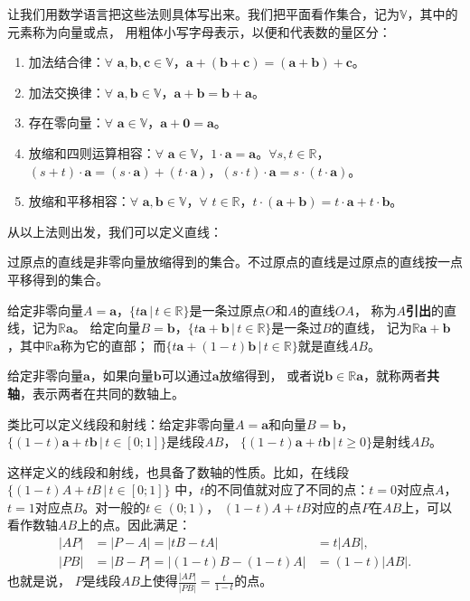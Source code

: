 \documentclass[12pt,UTF8,fontset=none]{ctexbook}
\begin{document}
让我们用数学语言把这些法则具体写出来。我们把平面看作集合，记为$\mathbb{V}$，其中的元素称为向量或点，
用粗体小写字母表示，以便和代表数的量区分：
\begin{enumerate}
    \item 加法结合律：$\forall \,\, \mathbf{a}, \mathbf{b}, \mathbf{c} \in \mathbb{V}$，$\mathbf{a}+ (\mathbf{b} + \mathbf{c}) = (\mathbf{a} + \mathbf{b}) + \mathbf{c}$。
    \item 加法交换律：$\forall \,\, \mathbf{a}, \mathbf{b} \in \mathbb{V}$，$\mathbf{a} + \mathbf{b} = \mathbf{b} + \mathbf{a}$。
    \item 存在零向量：$\forall \,\, \mathbf{a} \in \mathbb{V}$，$\mathbf{a} + \mathbf{0} = \mathbf{a}$。
    \item 放缩和四则运算相容：$\forall \,\, \mathbf{a} \in \mathbb{V}$，$1\cdot \mathbf{a} = \mathbf{a}$。$\forall s, t \in \mathbb{R}$，$(s + t)\cdot\mathbf{a} = (s\cdot\mathbf{a}) + (t\cdot\mathbf{a})$，$(s \cdot t)\cdot \mathbf{a} = s \cdot (t\cdot \mathbf{a})$。
    \item 放缩和平移相容：$\forall \,\, \mathbf{a}, \mathbf{b} \in \mathbb{V}$，$\forall \,\, t \in \mathbb{R}$，$t\cdot(\mathbf{a} + \mathbf{b}) = t\cdot\mathbf{a} + t\cdot\mathbf{b}$。
\end{enumerate}

从以上法则出发，我们可以定义直线：
\begin{df}
    过原点的直线是非零向量放缩得到的集合。不过原点的直线是过原点的直线按一点平移得到的集合。
\end{df}
给定非零向量$A = \mathbf{a}$，$ \{t\mathbf{a} \, | \, t\in\mathbb{R}\}$是一条过原点$O$和$A$的直线$OA$，
称为$A$\textbf{引出}的直线，记为$\mathbb{R}\mathbf{a}$。
给定向量$B = \mathbf{b}$，$ \{t\mathbf{a}+\mathbf{b} \, | \, t\in\mathbb{R}\}$是一条过$B$的直线，
记为$\mathbb{R}\mathbf{a}+\mathbf{b}$，其中$\mathbb{R}\mathbf{a}$称为它的直部；
而$ \{t\mathbf{a}+(1 - t)\mathbf{b} \, | \, t\in\mathbb{R}\}$就是直线$AB$。

给定非零向量$\mathbf{a}$，如果向量$\mathbf{b}$可以通过$\mathbf{a}$放缩得到，
或者说$\mathbf{b}\in \mathbb{R}\mathbf{a}$，就称两者\textbf{共轴}，表示两者在共同的数轴上。

类比可以定义线段和射线：给定非零向量$A = \mathbf{a}$和向量$B =\mathbf{b}$，
$ \{(1 - t)\mathbf{a}+t\mathbf{b} \, | \, t\in [0; 1]\}$是线段$AB$，
$ \{(1 - t)\mathbf{a}+t\mathbf{b} \, | \, t \geqslant 0 \}$是射线$AB$。

这样定义的线段和射线，也具备了数轴的性质。比如，在线段$\{(1 - t)A+tB \, | \, t\in [0; 1]\}$
中，$t$的不同值就对应了不同的点：$t = 0$对应点$A$，$t=1$对应点$B$。对一般的$t\in (0;1)$，
$(1 - t)A+tB$对应的点$P$在$AB$上，可以看作数轴$AB$上的点。因此满足：
$$
\begin{array}{lll}
    |AP| &= |P - A| = |tB - tA| &= t|AB|, \\
    |PB| &= |B - P| = |(1 - t)B - (1 - t)A| &= (1 - t)|AB|.
\end{array}
$$
也就是说，
$P$是线段$AB$上使得$ \frac{|AP|}{|PB|} = \frac{t}{1 - t}$的点。
\end{document}
